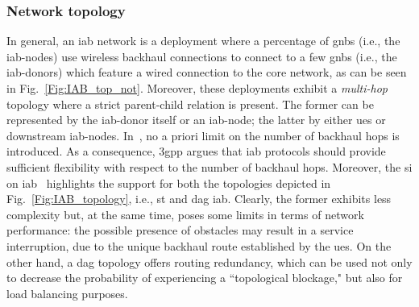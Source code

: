 \subsubsection{Network topology}
In general, an \gls{iab} network is a deployment where a percentage of \glspl{gnb} (i.e., the \gls{iab}-nodes) use wireless backhaul connections to connect to a few \glspl{gnb} (i.e., the \gls{iab}-donors) which feature a wired connection to the core network, as can be seen in Fig.~\ref{Fig:IAB_top_not}.
Moreover, these deployments exhibit a \textit{multi-hop} topology where a strict parent-child relation is present. The former can be represented by the \gls{iab}-donor itself or an \gls{iab}-node; the latter by either \gls{ue}s or downstream \gls{iab}-nodes. In~\cite{3gpp_38_874}, no a priori limit on the number of backhaul hops is introduced. As a consequence, \gls{3gpp} argues that \gls{iab} protocols should provide sufficient flexibility with respect to the number of backhaul hops. 
Moreover, the \gls{si} on \gls{iab}~\cite{3gpp_38_874} highlights the support for both the topologies depicted in Fig.~\ref{Fig:IAB_topology}, i.e., \gls{st} and \gls{dag} \gls{iab}. Clearly, the former exhibits less complexity but, at the same time, poses some limits in terms of network performance: the possible presence of obstacles may result in a service interruption, due to the unique backhaul route established by the \glspl{ue}. 
On the other hand, a \gls{dag} topology offers routing redundancy, which can be used not only to decrease the probability of experiencing a ``topological blockage," but also for load balancing purposes.



